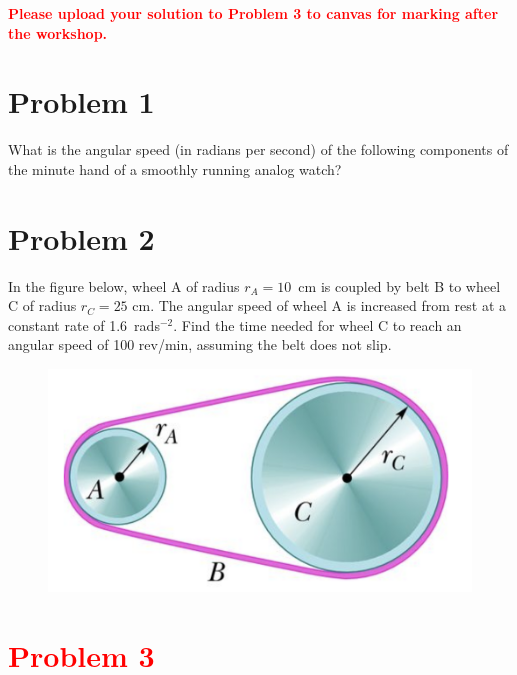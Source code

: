 \documentclass[11pt]{article}
\begin{document}
\noindent
\textbf{\textcolor{red}{Please upload your solution to Problem 3 to canvas for marking after the workshop.}}\\

\section*{Problem 1}

What is the angular speed (in radians per second) of the following components of the minute hand of a smoothly running analog watch?\\


\noindent

\section*{Problem 2}

In the figure below, wheel A of radius $r_A = 10$~cm is coupled by belt B to wheel C of radius $r_C = 25$ cm. The angular speed of wheel A is increased from rest at a constant rate of 1.6~rads$^{-2}$. Find the time needed for wheel C to reach an angular speed of 100 rev/min, assuming the belt does not slip. 

\begin{figure}[h]
\includegraphics[scale=0.4]{2021-W7-Q2}

\end{figure}

\section*{\textcolor{red}{Problem 3}}
\end{document}
